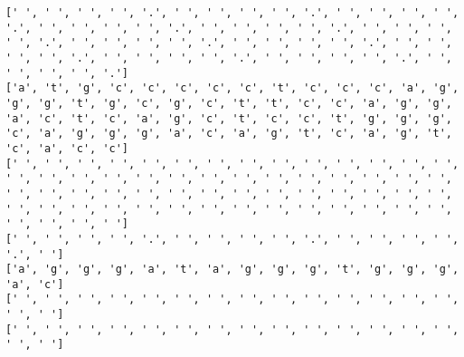 \documentclass{article}
\begin{document}
\begin{Verbatim}
[' ', ' ', ' ', ' ', '.', ' ', ' ', ' ', ' ', '.', ' ', ' ', ' ', ' ', '.', ' ', ' ', ' ', ' ', '.', ' ', ' ', ' ', ' ', '.', ' ', ' ', ' ', ' ', '.', ' ', ' ', ' ', ' ', '.', ' ', ' ', ' ', ' ', '.', ' ', ' ', ' ', ' ', '.', ' ', ' ', ' ', ' ', '.', ' ', ' ', ' ', ' ', '.', ' ', ' ', ' ', ' ', '.']
['a', 't', 'g', 'c', 'c', 'c', 'c', 'c', 't', 'c', 'c', 'c', 'a', 'g', 'g', 'g', 't', 'g', 'c', 'g', 'c', 't', 't', 'c', 'c', 'a', 'g', 'g', 'a', 'c', 't', 'c', 'a', 'g', 'c', 't', 'c', 'c', 't', 'g', 'g', 'g', 'c', 'a', 'g', 'g', 'g', 'a', 'c', 'a', 'g', 't', 'c', 'a', 'g', 't', 'c', 'a', 'c', 'c']
[' ', ' ', ' ', ' ', ' ', ' ', ' ', ' ', ' ', ' ', ' ', ' ', ' ', ' ', ' ', ' ', ' ', ' ', ' ', ' ', ' ', ' ', ' ', ' ', ' ', ' ', ' ', ' ', ' ', ' ', ' ', ' ', ' ', ' ', ' ', ' ', ' ', ' ', ' ', ' ', ' ', ' ', ' ', ' ', ' ', ' ', ' ', ' ', ' ', ' ', ' ', ' ', ' ', ' ', ' ', ' ', ' ', ' ', ' ', ' ']
[' ', ' ', ' ', ' ', '.', ' ', ' ', ' ', ' ', '.', ' ', ' ', ' ', ' ', '.', ' ']
['a', 'g', 'g', 'g', 'a', 't', 'a', 'g', 'g', 'g', 't', 'g', 'g', 'g', 'a', 'c']
[' ', ' ', ' ', ' ', ' ', ' ', ' ', ' ', ' ', ' ', ' ', ' ', ' ', ' ', ' ', ' ']
[' ', ' ', ' ', ' ', ' ', ' ', ' ', ' ', ' ', ' ', ' ', ' ', ' ', ' ', ' ', ' ']
 

\end{Verbatim}
\end{document}
